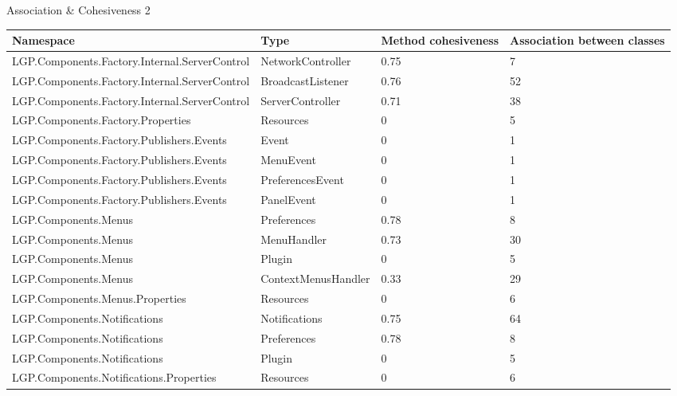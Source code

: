 \begin{table}[h!t]
				\caption{Association \& Cohesiveness 2}			
				\label{tab:AssociationCohesiveness2}
				
			\end{table}
			
		\newpage
			
			\begin{table}[h!t]
				\footnotesize{\begin{tabular}{ | p{85mm} | p{35mm} | p{13mm} | p{14mm}  | }	
																						\hline
				Namespace & Type  & Method cohesiveness & Association between classes  \\ \hline				
				LGP.Components.Factory.Internal.ServerControl & NetworkController & 0.75  & 7 \\ \hline
				LGP.Components.Factory.Internal.ServerControl & BroadcastListener & 0.76  & \cellcolor{ored}52 \\ \hline
				LGP.Components.Factory.Internal.ServerControl & ServerController & 0.71  & 38 \\ \hline
				LGP.Components.Factory.Properties & Resources & 0     & 5 \\ \hline
				LGP.Components.Factory.Publishers.Events & Event & 0     & 1 \\ \hline
				LGP.Components.Factory.Publishers.Events & MenuEvent & 0     & 1 \\ \hline
				LGP.Components.Factory.Publishers.Events & PreferencesEvent & 0     & 1 \\ \hline
				LGP.Components.Factory.Publishers.Events & PanelEvent & 0     & 1 \\ \hline
				LGP.Components.Menus & Preferences & 0.78  & 8 \\ \hline
				LGP.Components.Menus & MenuHandler & 0.73  & 30 \\ \hline
				LGP.Components.Menus & Plugin & 0     & 5 \\ \hline
				LGP.Components.Menus & ContextMenusHandler & 0.33  & 29 \\ \hline
				LGP.Components.Menus.Properties & Resources & 0     & 6 \\ \hline
				LGP.Components.Notifications & Notifications & 0.75  & \cellcolor{ored}64 \\ \hline
				LGP.Components.Notifications & Preferences & 0.78  & 8 \\ \hline
				LGP.Components.Notifications & Plugin & 0     & 5 \\ \hline
				LGP.Components.Notifications.Properties & Resources & 0     & 6 \\ \hline

\end{tabular}}
\end{table}
